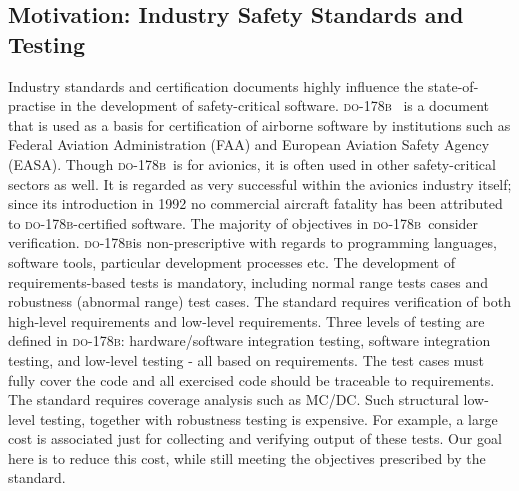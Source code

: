 \documentclass[sttt,draft]{svjour}
\newcommand{\DOB}{\textsc{do-178b}}
\begin{document}
\subsection{Motivation: Industry Safety Standards and Testing}
Industry standards and certification documents highly influence the
state-of-practise in the development of safety-critical
software. \DOB\ \cite{do178b} is a document that is used as a basis
for certification of airborne software by institutions such as Federal
Aviation Administration (FAA) and European Aviation Safety Agency
(EASA). Though \DOB\ is for avionics, it is often used in other
safety-critical sectors as well. It is regarded as very successful
within the avionics industry itself; since its introduction in 1992 no
commercial aircraft fatality has been attributed to \DOB-certified
software. The majority of objectives in \DOB\ consider
verification. \DOB is non-prescriptive with regards to programming
languages, software tools, particular development processes etc. The
development of requirements-based tests is mandatory, including normal
range tests cases and robustness (abnormal range) test cases. The
standard requires verification of both high-level requirements and
low-level requirements. Three levels of testing are defined in \DOB:
hardware/software integration testing, software integration testing,
and low-level testing - all based on requirements. The test cases must
fully cover the code and all exercised code should be traceable to
requirements. The standard requires coverage analysis such as
MC/DC. Such structural low-level testing, together with robustness
testing is expensive. For example, a large cost is associated just for
collecting and verifying output of these tests. Our goal here is to
reduce this cost, while still meeting the objectives prescribed by the
standard.
\end{document}
